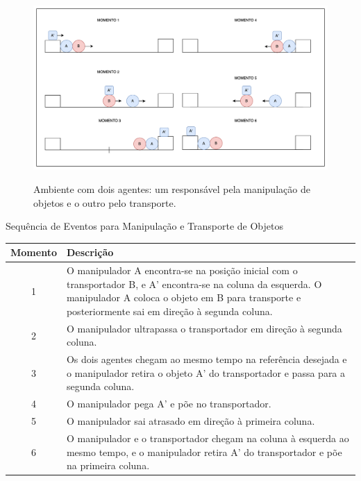 \begin{figure}[ht]
\centering
\caption{Ambiente com dois agentes: um responsável pela manipulação de objetos e o outro pelo transporte.}
\includegraphics[width=1\linewidth]{figures/Simulation/Simples/caso_simples.png}
\label{fig:simple_case}
\end{figure}

\begin{quadro}[h]
\centering
\caption{Sequência de Eventos para Manipulação e Transporte de Objetos}
\begin{tabularx}{\textwidth}{|c|X|}
\hline
\textbf{Momento} & \textbf{Descrição} \\
\hline
1 & O manipulador A encontra-se na posição inicial com o transportador B, e A' encontra-se na coluna da esquerda. O manipulador A coloca o objeto em B para transporte e posteriormente sai em direção à segunda coluna. \\
\hline
2 & O manipulador ultrapassa o transportador em direção à segunda coluna. \\
\hline
3 & Os dois agentes chegam ao mesmo tempo na referência desejada e o manipulador retira o objeto A' do transportador e passa para a segunda coluna. \\
\hline
4 & O manipulador pega A' e põe no transportador. \\
\hline
5 & O manipulador sai atrasado em direção à primeira coluna. \\
\hline
6 & O manipulador e o transportador chegam na coluna à esquerda ao mesmo tempo, e o manipulador retira A' do transportador e põe na primeira coluna. \\
\hline
\end{tabularx}
\label{quadro:sequencia_eventos}
\end{quadro}

